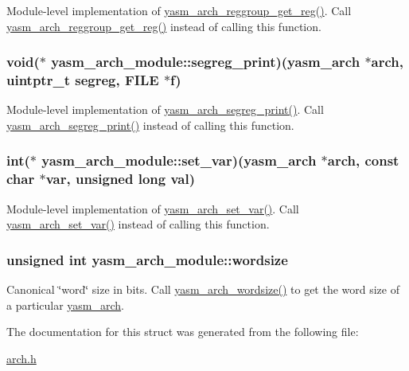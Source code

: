 Module-\/level implementation of \hyperlink{arch_8h_a36f66dab0dda54a462a0ffde3a0ffd3f}{yasm\-\_\-arch\-\_\-reggroup\-\_\-get\-\_\-reg()}. Call \hyperlink{arch_8h_a36f66dab0dda54a462a0ffde3a0ffd3f}{yasm\-\_\-arch\-\_\-reggroup\-\_\-get\-\_\-reg()} instead of calling this function. \hypertarget{structyasm__arch__module_a0cc2000fdd21f86497271c6957f0a833}{
\subsubsection[{segreg\-\_\-print}]{\setlength{\rightskip}{0pt plus 5cm}void($\ast$ yasm\-\_\-arch\-\_\-module\-::segreg\-\_\-print)({\bf yasm\-\_\-arch} $\ast$arch, uintptr\-\_\-t segreg, F\-I\-L\-E $\ast$f)}}\label{structyasm__arch__module_a0cc2000fdd21f86497271c6957f0a833}
Module-\/level implementation of \hyperlink{arch_8h_a36b6f88e9baf65e7de03a63afed67f3f}{yasm\-\_\-arch\-\_\-segreg\-\_\-print()}. Call \hyperlink{arch_8h_a36b6f88e9baf65e7de03a63afed67f3f}{yasm\-\_\-arch\-\_\-segreg\-\_\-print()} instead of calling this function. \hypertarget{structyasm__arch__module_a8479f90a6dc66a0e092149d39bb0240e}{
\subsubsection[{set\-\_\-var}]{\setlength{\rightskip}{0pt plus 5cm}int($\ast$ yasm\-\_\-arch\-\_\-module\-::set\-\_\-var)({\bf yasm\-\_\-arch} $\ast$arch, const char $\ast$var, unsigned long val)}}\label{structyasm__arch__module_a8479f90a6dc66a0e092149d39bb0240e}
Module-\/level implementation of \hyperlink{arch_8h_a06d7d1d8a7e999c8188e9fa6ae88fe0e}{yasm\-\_\-arch\-\_\-set\-\_\-var()}. Call \hyperlink{arch_8h_a06d7d1d8a7e999c8188e9fa6ae88fe0e}{yasm\-\_\-arch\-\_\-set\-\_\-var()} instead of calling this function. \hypertarget{structyasm__arch__module_ac83222855b248fc10ccfd393279fe9a4}{
\subsubsection[{wordsize}]{\setlength{\rightskip}{0pt plus 5cm}unsigned int yasm\-\_\-arch\-\_\-module\-::wordsize}}\label{structyasm__arch__module_ac83222855b248fc10ccfd393279fe9a4}
Canonical \char`\"{}word\char`\"{} size in bits. Call \hyperlink{arch_8h_a7812ab1f993e1327fd1c1acafa63ca1e}{yasm\-\_\-arch\-\_\-wordsize()} to get the word size of a particular \hyperlink{coretype_8h_a8e0de61d73c940f0e7b6ef12e0dc1c70}{yasm\-\_\-arch}. 

The documentation for this struct was generated from the following file\-:\begin{DoxyCompactItemize}
\item 
\hyperlink{arch_8h}{arch.\-h}\end{DoxyCompactItemize}
